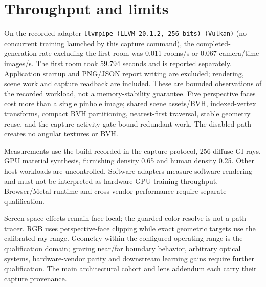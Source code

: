 \section{Throughput and limits}
On the recorded adapter \texttt{llvmpipe (LLVM 20.1.2, 256 bits) (Vulkan)} (no concurrent training launched by this capture command), the completed-generation rate excluding the first room was 0.011 rooms/s or 0.067 camera/time images/s. The first room took 59.794 seconds and is reported separately. Application startup and PNG/JSON report writing are excluded; rendering, scene work and capture readback are included. These are bounded observations of the recorded workload, not a memory-stability guarantee. Five perspective faces cost more than a single pinhole image; shared scene assets/BVH, indexed-vertex transforms, compact BVH partitioning, nearest-first traversal, stable geometry reuse, and the capture activity gate bound redundant work. The disabled path creates no angular textures or BVH.

Measurements use the build recorded in the capture protocol, 256 diffuse-GI rays, GPU material synthesis, furnishing density 0.65 and human density 0.25. Other host workloads are uncontrolled. Software adapters measure software rendering and must not be interpreted as hardware GPU training throughput. Browser/Metal runtime and cross-vendor performance require separate qualification.

Screen-space effects remain face-local; the guarded color resolve is not a path tracer. RGB uses perspective-face clipping while exact geometric targets use the calibrated ray range. Geometry within the configured operating range is the qualification domain; grazing near/far boundary behavior, arbitrary optical systems, hardware-vendor parity and downstream learning gains require further qualification. The main architectural cohort and lens addendum each carry their capture provenance.

